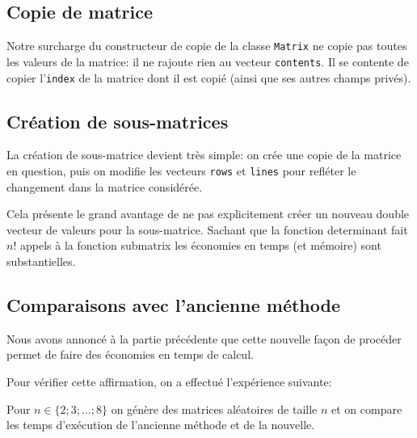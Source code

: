 \documentclass[a4paper,11pt]{article}
\begin{document}
\subsection{Copie de matrice}

Notre surcharge du constructeur de copie de la classe \texttt{Matrix}  ne copie pas toutes les valeurs de la matrice: il ne rajoute rien au vecteur \texttt{contents}. Il se contente de copier l'\texttt{index} de la matrice dont il est copié (ainsi que ses autres champs privés).

\subsection{Création de sous-matrices}

La création de sous-matrice devient très simple: on crée une copie de la matrice en question, puis on modifie les vecteurs \texttt{rows} et \texttt{lines} pour refléter le changement dans la matrice considérée.

Cela présente le grand avantage de ne pas explicitement créer un nouveau double vecteur de valeurs pour la sous-matrice. Sachant que la fonction determinant fait $n!$ appels à la fonction submatrix les économies en temps (et mémoire) sont substantielles.


\subsection{Comparaisons avec l'ancienne méthode}

Nous avons annoncé à la partie précédente que cette nouvelle façon de procéder permet de faire des économies en temps de calcul.

Pour vérifier cette affirmation, on a effectué l'expérience suivante:

Pour $n \in \{2;3;\dots;8\}$ on génère des matrices aléatoires de taille $n$ et on compare les temps d'exécution de l'ancienne méthode et de la nouvelle.
\end{document}
